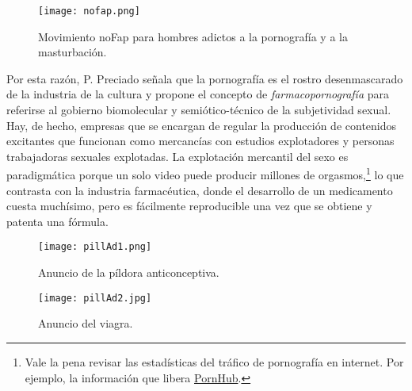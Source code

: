 \begin{figure}[htbp]
	\centering
	\texttt{[image: nofap.png]}
	\caption[Movimiento noFap.]{Movimiento noFap para hombres adictos a la pornografía y a la masturbación.}
	\label{fig:noFap}
\end{figure}

Por esta razón, P. Preciado señala que la pornografía es el rostro desenmascarado de la industria de la cultura y propone el concepto de \emph{farmacopornografía} para referirse al gobierno biomolecular y semiótico-técnico de la subjetividad sexual. Hay, de hecho, empresas que se encargan de regular la producción de contenidos excitantes que funcionan como mercancías con estudios explotadores y personas trabajadoras sexuales explotadas. La explotación mercantil del sexo es paradigmática porque un solo video puede producir millones de orgasmos,\footnote{Vale la pena revisar las estadísticas del tráfico de pornografía en internet. Por ejemplo, la información que libera \href{www.pornhub.com/insights/category/stats}{PornHub}.} lo que contrasta con la industria farmacéutica, donde el desarrollo de un medicamento cuesta muchísimo, pero es fácilmente reproducible una vez que se obtiene y patenta una fórmula.

\begin{figure}[htbp]
	\centering
	\texttt{[image: pillAd1.png]}
	\caption{Anuncio de la píldora anticonceptiva.}
	\label{fig:anticonceptiva}
\end{figure}

\begin{figure}[htbp]
	\centering
	\texttt{[image: pillAd2.jpg]}
	\caption{Anuncio del viagra.}
	\label{fig:viagra}
\end{figure}

